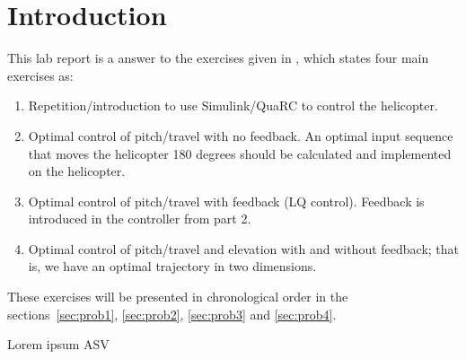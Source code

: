 \section{Introduction}
This lab report is a answer to the exercises given in \cite{labex},
which states four main exercises as:
\begin{enumerate}
\item Repetition/introduction to use Simulink/QuaRC to control the
helicopter.
\item Optimal control of pitch/travel with no feedback. An optimal
input sequence that moves the helicopter 180 degrees should be
calculated and implemented on the helicopter.
\item Optimal control of pitch/travel with feedback (LQ control).
Feedback is introduced in the controller from part 2.
\item Optimal control of pitch/travel and elevation with and without
feedback; that is, we have an optimal trajectory in two dimensions.
\end{enumerate}
These exercises will be presented in chronological order in the
sections~\ref{sec:prob1}, \ref{sec:prob2}, \ref{sec:prob3} and
\ref{sec:prob4}.

\cite{12gr730}

Lorem ipsum \acl{ASV}
